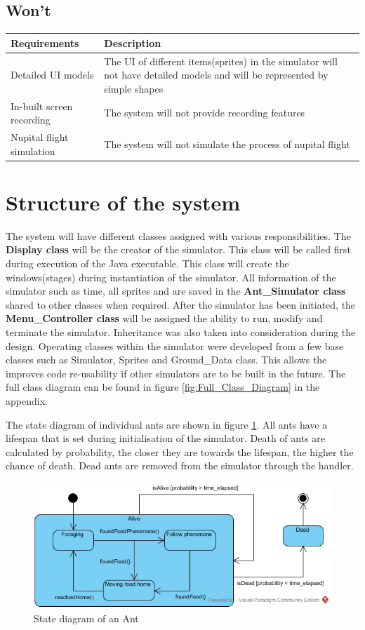 \documentclass[a4paper, oneside, 11pt]{report}
\begin{document}
\subsection{Won't}
\begin{tabular}{|| p{3.5cm} | p{10.5cm} ||} 
	\hline
	Requirements & Description \\
	\hline
	Detailed UI models &  The UI of different items(sprites) in the simulator will not have detailed models and will be represented by simple shapes\\
	\hline
	In-built screen recording & The system will not provide recording features \\
	\hline
	Nupital flight simulation & The system will not simulate the process of nupital flight \\
	\hline
\end{tabular}

\section{Structure of the system}
The system will have different classes assigned with various responsibilities. The \textbf{Display class} will be the creator of the simulator. This class will be called first during execution of the Java executable. This class will create the windows(stages) during instantiation of the simulator. All information of the simulator such as time, all sprites and are saved in the \textbf{Ant\_Simulator class} shared to other classes when required. After the simulator has been initiated, the \textbf{Menu\_Controller class} will be assigned the ability to run, modify and terminate the simulator. Inheritance was also taken into consideration during the design. Operating classes within the simulator were developed from a few base classes such as Simulator, Sprites and Ground\_Data class. This allows the improves code re-usability if other simulators are to be built in the future. The full class diagram can be found in figure \ref{fig:Full_Class_Diagram} in the appendix.

  The state diagram of individual ants are shown in figure \ref{fig:State_Diagram}. All ants have a lifespan that is set during initialisation of the simulator. Death of ants are calculated by probability, the closer they are towards the lifespan, the higher the chance of death. Dead ants are removed from the simulator through the handler.

\begin{figure}[htb]
	\begin{center}
	\includegraphics[width=0.8 \columnwidth]{State_Diagram.jpg}
	\caption{State diagram of an Ant}
	\label{fig:State_Diagram}
	\end{center}
\end{figure}
\end{document}
